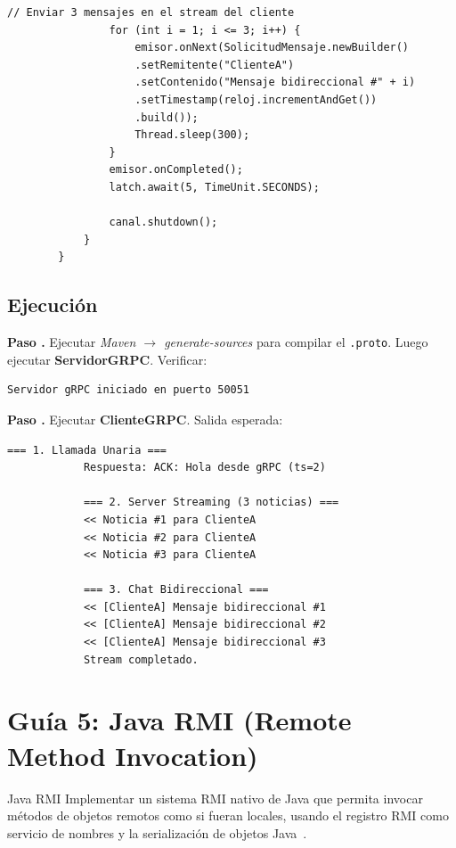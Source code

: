 \documentclass[12pt, a4paper, openany]{book}
\newcounter{paso}[section]
\newcommand{\resetpasos}{\setcounter{paso}{0}}
\newcommand{\paso}[1]{%
	\stepcounter{paso}%
	\medskip\noindent
	\begin{tcolorbox}[enhanced, colback=white, colframe=practiceBlue,
		boxrule=0.8pt, arc=3pt, left=6pt, right=6pt, top=4pt, bottom=4pt,
		before upper={\noindent}]
		\textcolor{practiceBlue}{\textbf{Paso \arabic{paso}.}} #1
	\end{tcolorbox}%
}
\newcommand{\code}[1]{\texttt{\small#1}}
\newcommand{\menu}[1]{\textit{#1}}
\begin{document}
\begin{lstlisting}[style=JavaStyle, caption={ClienteGRPC.java --- Cliente que demuestra los tres tipos de llamada}]
				// Enviar 3 mensajes en el stream del cliente
				for (int i = 1; i <= 3; i++) {
					emisor.onNext(SolicitudMensaje.newBuilder()
					.setRemitente("ClienteA")
					.setContenido("Mensaje bidireccional #" + i)
					.setTimestamp(reloj.incrementAndGet())
					.build());
					Thread.sleep(300);
				}
				emisor.onCompleted();
				latch.await(5, TimeUnit.SECONDS);
				
				canal.shutdown();
			}
		}
	\end{lstlisting}
	
	\section{Ejecución}
	
	\paso{Ejecutar \menu{Maven $\to$ generate-sources} para compilar el \code{.proto}.
		Luego ejecutar \textbf{ServidorGRPC}. Verificar:}
	
	\begin{resultadobox}
		\begin{lstlisting}[style=BashStyle]
			Servidor gRPC iniciado en puerto 50051
		\end{lstlisting}
	\end{resultadobox}
	
	\paso{Ejecutar \textbf{ClienteGRPC}. Salida esperada:}
	
	\begin{resultadobox}
		\begin{lstlisting}[style=BashStyle]
			=== 1. Llamada Unaria ===
			Respuesta: ACK: Hola desde gRPC (ts=2)
			
			=== 2. Server Streaming (3 noticias) ===
			<< Noticia #1 para ClienteA
			<< Noticia #2 para ClienteA
			<< Noticia #3 para ClienteA
			
			=== 3. Chat Bidireccional ===
			<< [ClienteA] Mensaje bidireccional #1
			<< [ClienteA] Mensaje bidireccional #2
			<< [ClienteA] Mensaje bidireccional #3
			Stream completado.
		\end{lstlisting}
	\end{resultadobox}
	
	\chapter{Guía 5: Java RMI (Remote Method Invocation)}
	\resetpasos
	
	\begin{objetivobox}{Java RMI}
		Implementar un sistema RMI nativo de Java que permita invocar métodos de objetos
		remotos como si fueran locales, usando el registro RMI como servicio de nombres
		y la serialización de objetos Java~\parencite{waldo1994}.
	\end{objetivobox}
	
\end{document}
